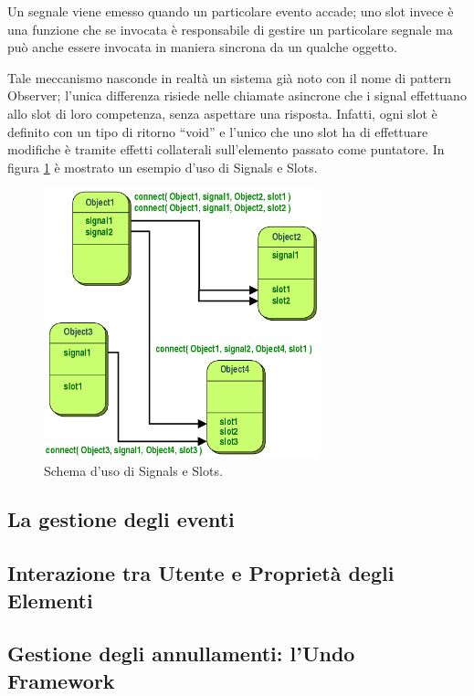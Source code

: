 Un segnale viene emesso quando un particolare evento accade; uno slot invece è una funzione che se invocata è responsabile di gestire un particolare segnale ma può anche essere invocata in maniera sincrona da un qualche oggetto.

Tale meccanismo nasconde in realtà un sistema già noto con il nome di pattern Observer; l'unica differenza risiede nelle chiamate asincrone che i signal effettuano allo slot di loro competenza, senza aspettare una risposta. Infatti, ogni slot è definito con un tipo di ritorno ``void'' e l'unico che uno slot ha di effettuare modifiche è tramite effetti collaterali sull'elemento passato come puntatore. In figura \ref{figura:qt_signals_slots} è mostrato un esempio d'uso di Signals e Slots.

\begin{figure}[!htb]
	\centering
	\includegraphics[width=8cm]{images/signals_slots.png}
	\caption{Schema d'uso di Signals e Slots.}
	\label{figura:qt_signals_slots}
\end{figure}

\subsection{La gestione degli eventi}

\subsection{Interazione tra Utente e Proprietà degli Elementi}

\subsection{Gestione degli annullamenti: l'Undo Framework}

